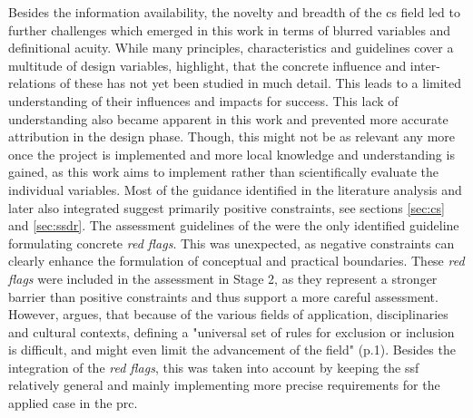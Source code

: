 Besides the information availability, the novelty and breadth of the \acrshort{cs} field led to further challenges which emerged in this work in terms of blurred variables and definitional acuity. While many principles, characteristics and guidelines cover a multitude of design variables, \textcite{kirschkeCitizenScienceProjects2022} highlight, that the concrete influence and inter-relations of these has not yet been studied in much detail. This leads to a limited understanding of their influences and impacts for success. This lack of understanding also became apparent in this work and prevented more accurate attribution in the design phase. Though, this might not be as relevant any more once the project is implemented and more local knowledge and understanding is gained, as this work aims to implement rather than scientifically evaluate the individual variables.\newline
Most of the guidance identified in the literature analysis and later also integrated suggest primarily positive constraints, see sections \ref{sec:cs} and \ref{sec:ssdr}. The assessment guidelines of the \textcite{ifrcCommunityBasedSurveillanceGuiding2017} were the only identified guideline formulating concrete \textit{red flags}. This was unexpected, as negative constraints can clearly enhance the formulation of conceptual and practical boundaries. These \textit{red flags} were included in the assessment in Stage 2, as they represent a stronger barrier than positive constraints and thus support a more careful assessment. However, \textcite{escaECSACharacteristicsCitizen2020} argues, that because of the various fields of application, disciplinaries and cultural contexts, defining a "universal set of rules for exclusion or inclusion is difficult, and might even limit the advancement of the field" (p.1). Besides the integration of the \textit{red flags}, this was taken into account by keeping the \acrshort{ssf} relatively general and mainly implementing more precise requirements for the applied case in the \acrshort{prc}.

